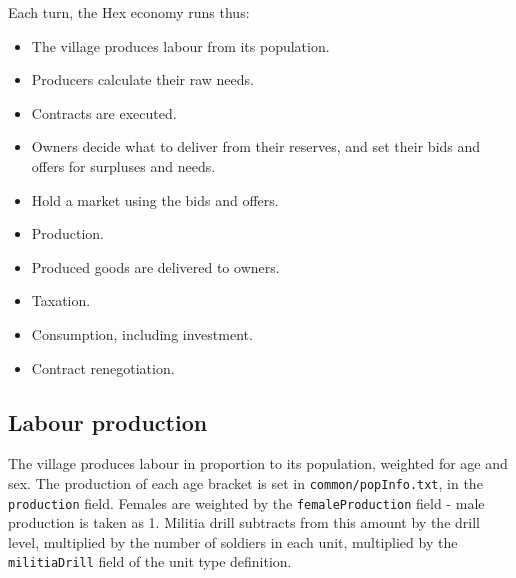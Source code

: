\documentclass[12pt,ebook,oneside]{book}
\begin{document}
Each turn, the Hex economy runs thus:
\begin{itemize}
\item The village produces labour from its population.
\item Producers calculate their raw needs.
\item Contracts are executed.
\item Owners decide what to deliver from their reserves,
and set their bids and offers for surpluses and needs.
\item Hold a market using the bids and offers.
\item Production.
\item Produced goods are delivered to owners.
\item Taxation.
\item Consumption, including investment.
\item Contract renegotiation.
\end{itemize}

\subsection{Labour production}

The village produces labour in proportion to its population, weighted
for age and sex. The production of each age bracket is set in
\texttt{common/popInfo.txt}, in the \texttt{production} field. Females
are weighted by the \texttt{femaleProduction} field - male production
is taken as 1. Militia drill subtracts from this amount by the drill
level, multiplied by the number of soldiers in each unit, multiplied
by the \texttt{militiaDrill} field of the unit type definition. 


\end{document}
